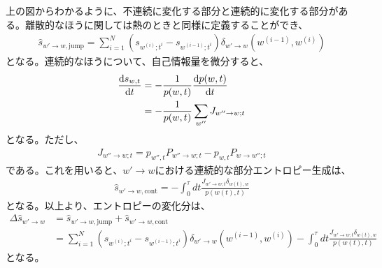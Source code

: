 \documentclass[a4paper,11pt]{jsarticle}
\numberwithin{equation}{section}
\begin{document}
上の図からわかるように、不連続に変化する部分と連続的に変化する部分がある。離散的なほうに関しては熱のときと同様に定義することができ、
\begin{align}
    \hat{s}_{w' \to w,\text{jump}} = \sum_{i=1}^{N} (s_{w^{(i)};t^i} - s_{w^{(i-1)};t^i})\delta_{w'\to w}(w^{(i-1)}, w^{(i)})
\end{align}
となる。連続的なほうについて、自己情報量を微分すると、
\begin{align}
    \dv{s_{w,t}}{t} &= -\frac{1}{p(w,t)}\dv{p(w,t)}{t}\\
    &= -\frac{1}{p(w,t)}\sum_{w''} J_{w'' \to w; t}
\end{align}
となる。ただし、
\begin{align}
    J_{w'' \to w; t} = p_{w'' ,t} P_{w'' \to w; t}- p_{w,t} P_{w \to w''; t}
\end{align}
である。これを用いると、$w' \to w$における連続的な部分エントロピー生成は、
\begin{align}
    \hat{s}_{w' \to w, \text{cont}} = -\int_{0}^{\tau} dt \frac{J_{w' \to w; t}\delta_{w(t), w}}{p(w(t), t)}
\end{align}
となる。以上より、エントロピーの変化分は、
\begin{align}
    \Delta \hat{s}_{w' \to w} &= \hat{s}_{w' \to w, \text{jump}} + \hat{s}_{w' \to w, \text{cont}}\\
    &= \sum_{i=1}^{N} (s_{w^{(i)};t^i} - s_{w^{(i-1)};t^i})\delta_{w'\to w}(w^{(i-1)}, w^{(i)}) -\int_{0}^{\tau} dt \frac{J_{w' \to w; t}\delta_{w(t), w}}{p(w(t), t)}
\end{align}
となる。\\
\end{document}

